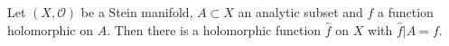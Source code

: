 Let $(X, \mathcal{O})$ be a Stein manifold, $A \subset X$ an analytic subset and $f$ a function holomorphic on $A$. Then there is a holomorphic function $\hat{f}$ on $X$ with $\hat{f}|A = f$.
